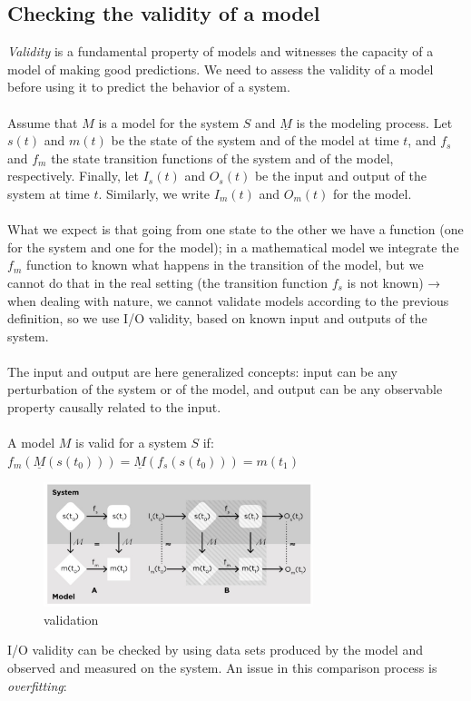 \subsection{Checking the validity of a model}

\emph{Validity} is a fundamental property of models and witnesses the
capacity of a model of making good predictions. We need to assess the validity of a
model before using it to predict the behavior of a system.
\\
\\
\noindent
Assume that $M$ is a model for the system $S$ and $\underline{M}$ is the
modeling process. Let $s(t)$ and $m(t)$ be the state of the system and
of the model at time $t$, and $f_s$ and $f_m$ the state transition
functions of the system and of the model, respectively. Finally, let
$I_s(t)$ and $O_s(t)$ be the input and output of the system at time $t$.
Similarly, we write $I_m(t)$ and $O_m(t)$ for the model.
\\
\\
\noindent
What we expect is that going from one state to the other we have a
function (one for the system and one for the model); in a mathematical
model we integrate the $f_m$ function to known what happens in the
transition of the model, but we cannot do that in the real setting (the
transition function $f_s$ is not known) → when dealing with nature, we
cannot validate models according to the previous definition, so we use
I/O validity, based on known input and outputs of the system.
\\
\\
\noindent
The input and output are here generalized concepts: input can be any
perturbation of the system or of the model, and output can be any
observable property causally related to the input.
\\
\\
\noindent
A model $M$ is valid for a system $S$ if:
$f_m(\underline{M}(s(t_0))) = \underline{M}(f_s(s(t_0))) = m(t_1)$

\begin{figure}
\centering
\includegraphics[width=0.7\textwidth]{validation.png}
\caption{validation}
\end{figure}
\noindent
I/O validity can be checked by using data sets produced by the model and
observed and measured on the system. An issue in this comparison process
is \emph{overfitting}:


